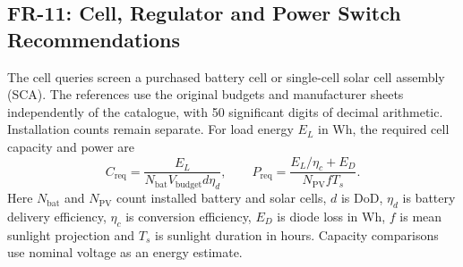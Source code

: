 \subsection{FR-11: Cell, Regulator and Power Switch Recommendations}
\label{appendix:cots-case-results}

The cell queries screen a purchased battery cell or single-cell solar cell assembly (SCA). The references use the original budgets and manufacturer sheets independently of the catalogue, with 50 significant digits of decimal arithmetic. Installation counts remain separate.
For load energy $E_L$ in Wh, the required cell capacity and power are
\begin{equation*}
C_{\mathrm{req}}=\frac{E_L}{N_{\mathrm{bat}}V_{\mathrm{budget}}d\eta_d},
\qquad
P_{\mathrm{req}}=\frac{E_L/\eta_c+E_D}{N_{\mathrm{PV}}fT_s}.
\end{equation*}
Here $N_{\mathrm{bat}}$ and $N_{\mathrm{PV}}$ count installed battery and solar cells, $d$ is DoD, $\eta_d$ is battery delivery efficiency, $\eta_c$ is conversion efficiency, $E_D$ is diode loss in Wh, $f$ is mean sunlight projection and $T_s$ is sunlight duration in hours.
Capacity comparisons use nominal voltage as an energy estimate.

